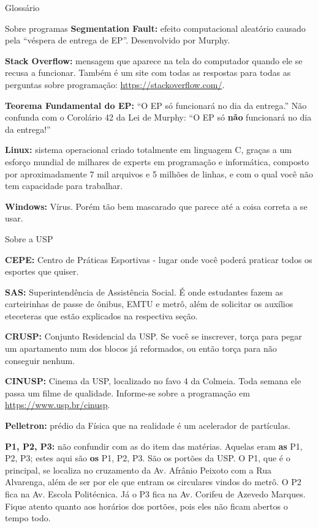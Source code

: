 \begin{secao}{Glossário}
\begin{subsecao}{Sobre programas}
{\bf Segmentation Fault:} efeito computacional aleatório causado pela ``véspera
de entrega de EP''. Desenvolvido por Murphy.

{\bf Stack Overflow:} mensagem que aparece na tela do computador
quando ele se recusa a funcionar. Também é um site com todas as respostas
para todas as perguntas sobre programação: \url{https://stackoverflow.com/}.

{\bf Teorema Fundamental do EP:} ``O EP só funcionará no dia da entrega.'' Não
confunda com o Corolário 42 da Lei de Murphy: ``O EP só {\bf não} funcionará no
dia da entrega!''

{\bf Linux:} sistema operacional criado totalmente em linguagem C, graças a um
esforço mundial de milhares de experts em programação e informática, composto
por aproximadamente 7 mil arquivos e 5 milhões de linhas, e com o qual você não
tem capacidade para trabalhar.

{\bf Windows:} Vírus. Porém tão bem mascarado que parece até a coisa correta a
se usar.
\end{subsecao}

\begin{subsecao}{Sobre a USP}

{\bf CEPE:} Centro de Práticas Esportivas - lugar onde você poderá praticar
todos os esportes que quiser.

{\bf SAS:} Superintendência de Assistência Social. É onde estudantes fazem as
carteirinhas de passe de ônibus, EMTU e metrô, além de solicitar os auxílios
eteceteras que estão explicados na respectiva seção.

{\bf CRUSP:} Conjunto Residencial da USP. Se você se inscrever, torça para
pegar um apartamento num dos blocos já reformados, ou então torça para não
conseguir nenhum.



{\bf CINUSP:} Cinema da USP, localizado no favo 4 da Colmeia. Toda semana ele
passa um filme de qualidade. Informe-se sobre a programação em
\url{https://www.usp.br/cinusp}.

{\bf Pelletron:} prédio da Física que na realidade é um acelerador de
partículas.

{\bf P1, P2, P3:} não confundir com as do item das matérias. Aquelas eram
{\bf as} P1, P2, P3; estes aqui são {\bf os} P1, P2, P3. São os portões da USP.
O P1, que é o principal, se localiza no cruzamento da Av. Afrânio Peixoto com a
Rua Alvarenga, além de ser por ele que entram os circulares vindos do metrô.
O P2 fica na Av. Escola Politécnica. Já o P3 fica na Av. Corifeu de Azevedo
Marques. Fique atento quanto aos horários dos portões, pois eles não ficam
abertos o tempo todo.


\end{subsecao}
\end{secao}
